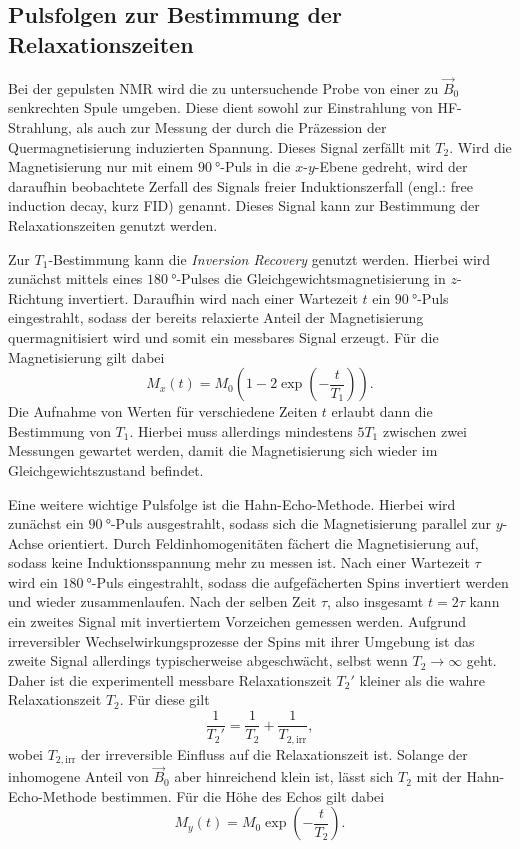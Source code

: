 \subsection{Pulsfolgen zur Bestimmung der Relaxationszeiten}
Bei der gepulsten NMR wird die zu untersuchende Probe von einer zu $\vec{B}_0$ senkrechten Spule umgeben. Diese dient sowohl zur Einstrahlung von HF-Strahlung, als auch zur Messung der durch die Präzession der Quermagnetisierung induzierten Spannung. Dieses Signal zerfällt mit $T_2$. Wird die Magnetisierung nur mit einem $\SI{90}{\degree}$-Puls in die $x$-$y$-Ebene gedreht, wird der daraufhin beobachtete Zerfall des Signals freier Induktionszerfall (engl.: free induction decay, kurz FID) genannt. Dieses Signal kann zur Bestimmung der Relaxationszeiten genutzt werden.

Zur $T_1$-Bestimmung kann die \textit{Inversion Recovery} genutzt werden. Hierbei wird zunächst mittels eines $\SI{180}{\degree}$-Pulses die Gleichgewichtsmagnetisierung in $z$-Richtung invertiert. Daraufhin wird nach einer Wartezeit $t$ ein $\SI{90}{\degree}$-Puls eingestrahlt, sodass der bereits relaxierte Anteil der Magnetisierung quermagnitisiert wird und somit ein messbares Signal erzeugt. Für die Magnetisierung gilt dabei
\begin{equation}
  M_x (t) = M_0 (1 - 2 \exp (-\frac{t}{T_1})).
  \label{eq:T1}
\end{equation}
Die Aufnahme von Werten für verschiedene Zeiten $t$ erlaubt dann die Bestimmung von $T_1$. Hierbei muss allerdings mindestens $5T_1$ zwischen zwei Messungen gewartet werden, damit die Magnetisierung sich wieder im Gleichgewichtszustand befindet.

Eine weitere wichtige Pulsfolge ist die Hahn-Echo-Methode. Hierbei wird zunächst ein $\SI{90}{\degree}$-Puls ausgestrahlt, sodass sich die Magnetisierung parallel zur $y$-Achse orientiert. Durch Feldinhomogenitäten fächert die Magnetisierung auf, sodass keine Induktionsspannung mehr zu messen ist. Nach einer Wartezeit $\tau$ wird ein $\SI{180}{\degree}$-Puls eingestrahlt, sodass die aufgefächerten Spins invertiert werden und wieder zusammenlaufen. Nach der selben Zeit $\tau$, also insgesamt $t = 2\tau$ kann ein zweites Signal mit invertiertem Vorzeichen gemessen werden. Aufgrund irreversibler Wechselwirkungsprozesse der Spins mit ihrer Umgebung ist das zweite Signal allerdings typischerweise abgeschwächt, selbst wenn $T_2 \rightarrow \infty$ geht. Daher ist die experimentell messbare Relaxationszeit $T_2'$ kleiner als die wahre Relaxationszeit $T_2$. Für diese gilt
\begin{equation*}
  \frac{1}{T_2'} = \frac{1}{T_2} + \frac{1}{T_{2,\mathrm{irr}}},
\end{equation*}
wobei $T_{2,\mathrm{irr}}$ der irreversible Einfluss auf die Relaxationszeit ist. Solange der inhomogene Anteil von $\vec{B}_0$ aber hinreichend klein ist, lässt sich $T_2$ mit der Hahn-Echo-Methode bestimmen. Für die Höhe des Echos gilt dabei
\begin{equation}
  M_y (t) = M_0 \exp (-\frac{t}{T_2}).
  \label{eq:T2}
\end{equation}

